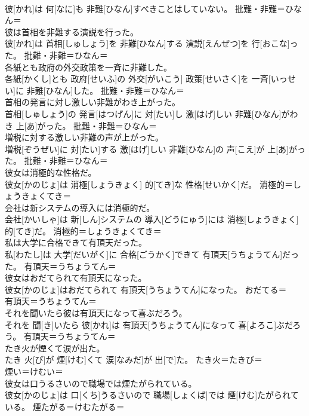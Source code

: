 \documentclass[8pt]{extreport}
\begin{document}
\begin{CJK}{UTF8}{min}
{\\	彼[かれ]は 何[なに]も 非難[ひなん]すべきことはしていない。	批難・非難＝ひなん＝ 
\\	彼は首相を非難する演説を行った。	
\\	彼[かれ]は 首相[しゅしょう]を 非難[ひなん]する 演説[えんぜつ]を 行[おこな]った。	批難・非難＝ひなん＝ 
\\	各紙とも政府の外交政策を一斉に非難した。	
\\	各紙[かくし]とも 政府[せいふ]の 外交[がいこう] 政策[せいさく]を 一斉[いっせい]に 非難[ひなん]した。	批難・非難＝ひなん＝ 
\\	首相の発言に対し激しい非難がわき上がった。	
\\	首相[しゅしょう]の 発言[はつげん]に 対[たい]し 激[はげ]しい 非難[ひなん]がわき 上[あ]がった。	批難・非難＝ひなん＝ 
\\	増税に対する激しい非難の声が上がった。	
\\	増税[ぞうぜい]に 対[たい]する 激[はげ]しい 非難[ひなん]の 声[こえ]が 上[あ]がった。	批難・非難＝ひなん＝ 
\\	彼女は消極的な性格だ。	
\\	彼女[かのじょ]は 消極[しょうきょく] 的[てき]な 性格[せいかく]だ。	消極的＝しょうきょくてき＝ 
\\	会社は新システムの導入には消極的だ。	
\\	会社[かいしゃ]は 新[しん]システムの 導入[どうにゅう]には 消極[しょうきょく] 的[てき]だ。	消極的＝しょうきょくてき＝ 
\\	私は大学に合格できて有頂天だった。	
\\	私[わたし]は 大学[だいがく]に 合格[ごうかく]できて 有頂天[うちょうてん]だった。	有頂天＝うちょうてん＝ 
\\	彼女はおだてられて有頂天になった。	
\\	彼女[かのじょ]はおだてられて 有頂天[うちょうてん]になった。	おだてる＝ 
\\	有頂天＝うちょうてん＝ 
\\	それを聞いたら彼は有頂天になって喜ぶだろう。	
\\	それを 聞[き]いたら 彼[かれ]は 有頂天[うちょうてん]になって 喜[よろこ]ぶだろう。	有頂天＝うちょうてん＝ 
\\	たき火が煙くて涙が出た。	
\\	たき 火[び]が 煙[けむ]くて 涙[なみだ]が 出[で]た。	たき火＝たきび＝ 
\\	煙い＝けむい＝ 
\\	彼女は口うるさいので職場では煙たがられている。	
\\	彼女[かのじょ]は 口[くち]うるさいので 職場[しょくば]では 煙[けむ]たがられている。	煙たがる＝けむたがる＝ 
}
\end{CJK}
\end{document}
